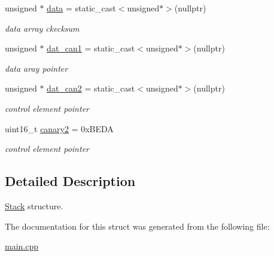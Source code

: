 \begin{DoxyCompactItemize}
\mbox{\label{struct_stack_a67fb5cb41d557b98e5a8cd5699e1ba8f}} 
unsigned $\ast$ \hyperlink{struct_stack_a67fb5cb41d557b98e5a8cd5699e1ba8f}{data} = static\+\_\+cast$<$unsigned$\ast$$>$(nullptr)
\begin{DoxyCompactList}\small\item\em data array ckecksum \end{DoxyCompactList}\item 
\mbox{\label{struct_stack_ae3b5cfcce1d3f0c6e281600a5a4ce0ea}} 
unsigned $\ast$ \hyperlink{struct_stack_ae3b5cfcce1d3f0c6e281600a5a4ce0ea}{dat\+\_\+can1} = static\+\_\+cast$<$unsigned$\ast$$>$(nullptr)
\begin{DoxyCompactList}\small\item\em data aray pointer \end{DoxyCompactList}\item 
\mbox{\label{struct_stack_acde7d81e3217c8585cfc5dfc89bf8365}} 
unsigned $\ast$ \hyperlink{struct_stack_acde7d81e3217c8585cfc5dfc89bf8365}{dat\+\_\+can2} = static\+\_\+cast$<$unsigned$\ast$$>$(nullptr)
\begin{DoxyCompactList}\small\item\em control element pointer \end{DoxyCompactList}\item 
\mbox{\label{struct_stack_a4b90f612738df33e56b75796d0525912}} 
uint16\+\_\+t \hyperlink{struct_stack_a4b90f612738df33e56b75796d0525912}{canary2} = 0x\+B\+E\+DA
\begin{DoxyCompactList}\small\item\em control element pointer \end{DoxyCompactList}\end{DoxyCompactItemize}


\subsection{Detailed Description}
\hyperlink{struct_stack}{Stack} structure. 

The documentation for this struct was generated from the following file\+:\begin{DoxyCompactItemize}
\item 
\hyperlink{main_8cpp}{main.\+cpp}\end{DoxyCompactItemize}
